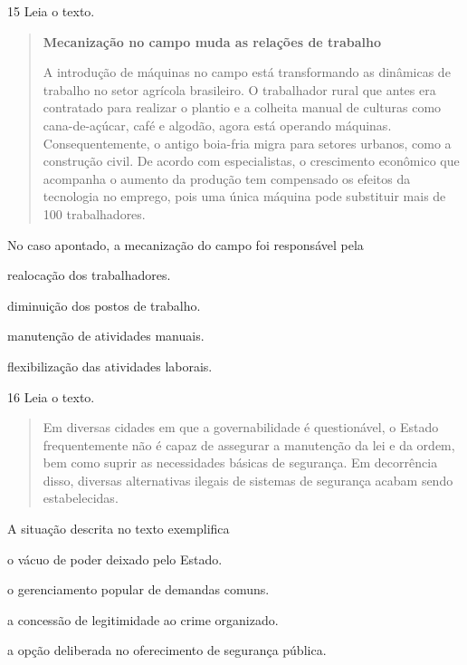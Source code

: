 \num{15} Leia o texto.

\begin{quote}
\textbf{Mecanização no campo muda as relações de trabalho}

A introdução de máquinas no campo está transformando as dinâmicas de trabalho no setor agrícola brasileiro. O trabalhador rural que antes era contratado para realizar o plantio e a colheita manual de culturas como cana-de-açúcar, café e algodão, agora está operando máquinas. Consequentemente, o antigo boia-fria migra para setores urbanos, como a construção civil. De acordo com especialistas, o crescimento econômico que acompanha o aumento da produção tem compensado os efeitos da tecnologia no emprego, pois uma única máquina pode substituir mais de 100 trabalhadores.

\end{quote}

No caso apontado, a mecanização do campo foi responsável pela

\begin{escolha}
\item  realocação dos trabalhadores.

\item  diminuição dos postos de trabalho.

\item  manutenção de atividades manuais.

\item  flexibilização das atividades laborais.
\end{escolha}

\num{16} Leia o texto.

\begin{quote}
Em diversas cidades em que a governabilidade é questionável, o Estado frequentemente não é capaz de assegurar a manutenção da lei e da ordem, bem como suprir as necessidades básicas de segurança. Em decorrência disso, diversas alternativas ilegais de sistemas de segurança acabam sendo estabelecidas.

\end{quote}

A situação descrita no texto exemplifica

\begin{escolha}
\item  o vácuo de poder deixado pelo Estado.

\item  o gerenciamento popular de demandas comuns.

\item  a concessão de legitimidade ao crime organizado.

\item  a opção deliberada no oferecimento de segurança pública.
\end{escolha}

